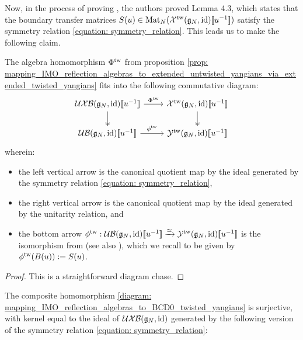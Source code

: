         Now, in the process of proving \cite[Theorem 4.1]{guay_regelskis_twisted_yangians_for_symmetric_pairs_of_types_BCD}, the authors proved Lemma 4.3, which states that the boundary transfer matrices $S(u) \in \operatorname{Mat}_N( \mathcal{X}^{\mathrm{tw}}(\mathfrak{g}_N, \mathrm{id})[\![u^{-1}]\!] )$ satisfy the symmetry relation \eqref{equation: symmetry_relation}. This leads us to make the following claim.
        \begin{theorem} \label{theorem: IMO_reflection_algebras_vs_BCD0_twisted_yangians}
            The algebra homomorphism $\Phi^{\mathrm{tw}}$ from proposition \ref{prop: mapping_IMO_reflection_algebras_to_extended_untwisted_yangians_via_extended_twisted_yangians} fits into the following commutative diagram:
                $$
                    \begin{tikzcd}
                    {\UXB(\g_N, \id)[\![u^{-1}]\!]} & {\calX^{\tw}(\g_N, \id)[\![u^{-1}]\!]} \\
                    {\UB(\g_N, \id)[\![u^{-1}]\!]} & {\calY^{\tw}(\g_N, \id)[\![u^{-1}]\!]}
                    \arrow["{{\Phi^{\tw}}}", from=1-1, to=1-2]
                    \arrow[two heads, from=1-1, to=2-1]
                    \arrow[two heads, from=1-2, to=2-2]
                    \arrow["\phi^{\tw}", from=2-1, to=2-2]
                    \end{tikzcd}
                $$
            wherein:
            \begin{itemize}
                \item the left vertical arrow is the canonical quotient map by the ideal generated by the symmetry relation \eqref{equation: symmetry_relation},
                \item the right vertical arrow is the canonical quotient map by the ideal generated by the unitarity relation, and
                \item the bottom arrow $\phi^{\mathrm{tw}}: \mathcal{UB}(\mathfrak{g}_N, \mathrm{id})[\![u^{-1}]\!] \xrightarrow[]{\simeq} \mathcal{Y}^{\mathrm{tw}}(\mathfrak{g}_N, \mathrm{id})[\![u^{-1}]\!]$ is the isomorphism from \cite[Theorem 4.1]{guay_regelskis_twisted_yangians_for_symmetric_pairs_of_types_BCD} (see also \cite[Equation 4.32]{guay_regelskis_twisted_yangians_for_symmetric_pairs_of_types_BCD}), which we recall to be given by $\phi^{\mathrm{tw}}( B(u) ) := S(u)$. 
            \end{itemize}
        \end{theorem}
            \begin{proof}
                This is a straightforward diagram chase.
            \end{proof}
        \begin{corollary} \label{coro: IMO_reflection_algebras_vs_BCD0_twisted_yangians}
            The composite homomorphism \eqref{diagram: mapping_IMO_reflection_algebras_to_BCD0_twisted_yangians} is surjective, with kernel equal to the ideal of $\mathcal{UXB}(\mathfrak{g}_N, \mathrm{id})$ generated by the following version of the symmetry relation \eqref{equation: symmetry_relation}:
        \end{corollary}